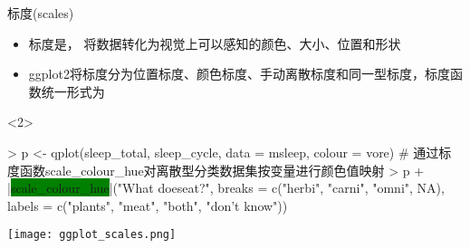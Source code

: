 \begin{frame}[t,fragile]{\subsecname}{标度(scales)}
\begin{itemize}
\item 标度是，
将数据转化为视觉上可以感知的颜色、大小、位置和形状
\item ggplot2将标度分为位置标度、颜色标度、手动离散标度和同一型标度，标度函数统一形式为
\end{itemize}

\begin{overlayarea}{\textwidth}{\textheight}

\begin{onlyenv}<2>
\begin{minipage}{\textwidth}
\begin{rcode}
> p <- qplot(sleep_total, sleep_cycle, data = msleep, colour = vore)
# 通过标度函数scale\_colour\_hue对离散型分类数据集按变量进行颜色值映射
> p + |\colorbox{green}{scale\_colour\_hue}|("What does\nit eat?", breaks = c("herbi", "carni", "omni", NA), labels = c("plants", "meat", "both", "don’t know"))
\end{rcode}
\end{minipage}

\begin{minipage}{\textwidth}
\centering
\texttt{[image: ggplot\_scales.png]}
\end{minipage}
\end{onlyenv}
\end{overlayarea}
\end{frame}

